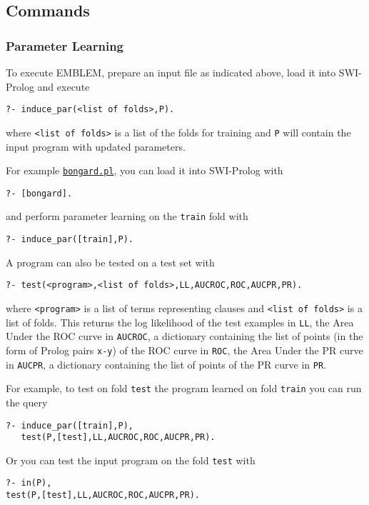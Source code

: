 \documentclass[a4paper,10pt]{scrartcl}
\begin{document}









\subsection{Commands}
\subsubsection{Parameter Learning}
To execute EMBLEM, prepare an input file as indicated above,
 load it into SWI-Prolog and execute
\begin{verbatim}
?- induce_par(<list of folds>,P).
\end{verbatim}
where \verb|<list of folds>| is a list of the folds for training and
\verb|P| will contain the input program with updated parameters.

For example \href{http://cplint.lamping.unife.it/example/learning/bongard.pl}{\texttt{bongard.pl}}, you can load it into SWI-Prolog
with
\begin{verbatim}
?- [bongard].
\end{verbatim}
and perform parameter learning on the \verb|train| fold with 
\begin{verbatim}
?- induce_par([train],P).
\end{verbatim}
A program can also be tested on a test set with
\begin{verbatim}
?- test(<program>,<list of folds>,LL,AUCROC,ROC,AUCPR,PR).
\end{verbatim}
where \verb|<program>| is a list of terms representing clauses and
\verb|<list of folds>| is a list of folds.
This returns the log likelihood of the test examples in \verb|LL|, the Area Under the ROC curve in \verb|AUCROC|, a dictionary containing the list of points (in the form of Prolog pairs \verb|x-y|) of the ROC curve in \verb|ROC|,
the Area Under the PR curve in \verb|AUCPR|, a dictionary containing the list of points of the PR curve in \verb|PR|.

For example, to test on fold \verb|test| the program learned on fold \verb|train| you can run the query
\begin{verbatim}
?- induce_par([train],P),
   test(P,[test],LL,AUCROC,ROC,AUCPR,PR).
\end{verbatim}
Or you can test the input program on the fold \verb|test| with
\begin{verbatim}
?- in(P),
test(P,[test],LL,AUCROC,ROC,AUCPR,PR).
\end{verbatim}
\end{document}
